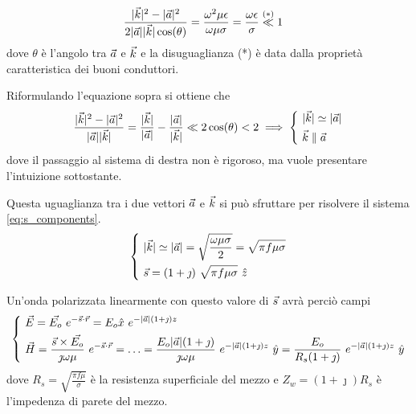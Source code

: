 		\begin{equation*} \begin{split}
			& \frac{|\vec{k}|^2 - |\vec{a}|^2}{2 |\vec{a}| |\vec{k}| \cos(\theta)}
				= \frac{\omega^2 \mu \epsilon}{\omega \mu \sigma}
				= \frac{\omega \epsilon}{\sigma} \stackrel{(*)}{\ll} 1
		\end{split} \end{equation*}
		dove $\theta$ è l'angolo tra $\vec{a}$ e $\vec{k}$ e la disuguaglianza (*) è data dalla proprietà caratteristica dei buoni conduttori.

		Riformulando l'equazione sopra si ottiene che
		\begin{equation*}
			\frac{|\vec{k}|^2 - |\vec{a}|^2}{|\vec{a}| |\vec{k}|}
				= \frac{|\vec{k}|}{|\vec{a}|} - \frac{|\vec{a}|}{|\vec{k}|}
				\ll 2 \cos(\theta) < 2 \implies
				\begin{dcases}
					~ |\vec{k}| \simeq |\vec{a}| \\
					~ \vec{k} \parallel \vec{a}
				\end{dcases}
		\end{equation*}
		dove il passaggio al sistema di destra non è rigoroso, ma vuole presentare l'intuizione sottostante.

		Questa uguaglianza tra i due vettori $\vec{a}$ e $\vec{k}$ si può sfruttare per risolvere il sistema \ref{eq:s_components}.
		\begin{equation*}
			\begin{dcases}
				~ |\vec{k}| \simeq |\vec{a}|
					= \sqrt{\frac{\omega \mu \sigma}{2}}
					= \sqrt{\pi f \mu \sigma} \\
				~ \vec{s} = (1 + \jmath) ~ \sqrt{\pi f \mu \sigma} ~ \hat{z} \\
			\end{dcases}
		\end{equation*}

		Un'onda polarizzata linearmente con questo valore di $\vec{s}$ avrà perciò campi
		\begin{equation*}
			\begin{dcases}
				~ \vec{E} = \vec{E_o} ~ e^{-\vec{s} \cdot \vec{r}} = E_o \hat{x} ~ e^{-|\vec{a}| (1 + \jmath) z} \\
				~ \vec{H} = \frac{\vec{s} \times \vec{E_o}}{\jmath \omega \mu} ~ e^{-\vec{s} \cdot \vec{r}}
					= \ldots = \frac{E_o |\vec{a}| (1 + \jmath)}{\jmath \omega \mu} ~ e^{-|\vec{a}| (1 + \jmath) z} ~ \hat{y}
					= \frac{E_o}{ R_s (1 + \jmath) } ~ e^{-|\vec{a}| (1 + \jmath) z} ~ \hat{y}
			\end{dcases}
		\end{equation*}
		dove $R_s = \sqrt{\frac{\pi f \mu}{\sigma}}$ è la resistenza superficiale del mezzo e $Z_w = (1 + \jmath) R_s$ è l'impedenza di parete del mezzo.

